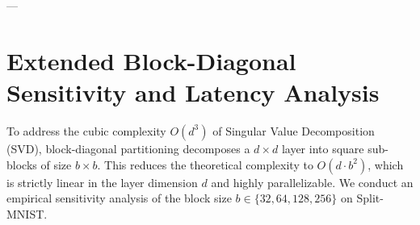 ---

\section{Extended Block-Diagonal Sensitivity and Latency Analysis}
\label{sec:appendix_block_latency}

To address the cubic complexity $O(d^3)$ of Singular Value Decomposition (SVD), block-diagonal partitioning decomposes a $d \times d$ layer into square sub-blocks of size $b \times b$. This reduces the theoretical complexity to $O(d \cdot b^2)$, which is strictly linear in the layer dimension $d$ and highly parallelizable. We conduct an empirical sensitivity analysis of the block size $b \in \{32, 64, 128, 256\}$ on Split-MNIST.

\begin{table}[ht]
\centering
\caption{\textbf{Block Size Sensitivity, Residuals, and Latency:} Evaluating the impact of block size $b$ on the Orthogonal Procrustes residual norm, average accuracy, and sequential CPU execution time (latency).}
\label{tab:block_sensitivity}
\vskip 0.1in
\begin{small}
\begin{sc}
\end{sc}
\end{small}
\vskip -0.1in
\end{table}

